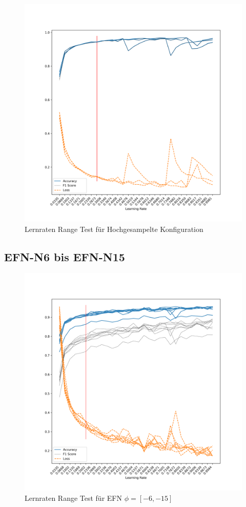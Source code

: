 \begin{figure}[H]
    \centering
    \includegraphics[height=0.45\textheight]{figures/appendix/lr_up}
    \caption{Lernraten Range Test für Hochgesampelte Konfiguration}
    \label{fig:apx:lr_up}
\end{figure}

\subsection*{EFN-N6 bis EFN-N15}
\begin{figure}[H]
    \centering
    \includegraphics[height=0.45\textheight]{figures/appendix/lr_downscaled}
    \caption{Lernraten Range Test für EFN $\phi = [-6, -15]$}
    \label{fig:apx:lr_down}
\end{figure}

